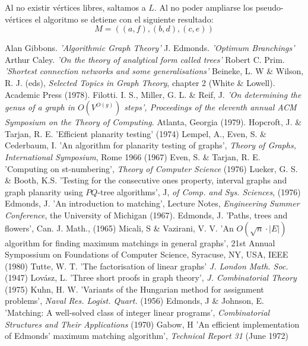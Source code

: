 \documentclass[10pt,a5paper]{book}
\begin{document}
Al no existir vértices libres, saltamos a $L$. Al no poder ampliarse los pseudo-vértices el algoritmo se detiene con el siguiente resultado:
\[ M = ((a,f),(b,d),(c,e)) \]

\begin{thebibliography}{99}
 Alan Gibbons. \emph{'Algorithmic Graph Theory'}
 J. Edmonds. \emph{'Optimum Branchings'}
 Arthur Caley. \emph{'On the theory of analytical form called trees'}
 Robert C. Prim. \emph{'Shortest connection networks and some generalisations'}
Beineke, L. W \& Wilson, R. J. (eds), \emph{Selected Topics in Graph Theory}, chapter 2 (White \& Lowell). Academic Press (1978).
Filotti. I. S., Miller, G. L. \& Reif, J. \emph{'On determining the genus of a graph in $O(V^{O(g)})$ steps', Proceedings of the eleventh annual ACM Symposium on the Theory of Computing}. Atlanta, Georgia (1979).
Hopcroft, J. \& Tarjan, R. E. 'Efficient planarity testing' (1974)
Lempel, A., Even, S. \& Cederbaum, I. 'An algorithm for planarity testing of graphs', \emph{Theory of Graphs, International Symposium}, Rome 1966 (1967)
Even, S. \& Tarjan, R. E. 'Computing on st-numbering', \emph{Theory of Computer Science} (1976)
Lueker, G. S. \& Booth, K.S. 'Testing for the consecutive ones property, interval graphs and graph planarity using $PQ$-tree algorithms', J, \emph{of Comp. and Sys. Sciences}, (1976)
 Edmonds, J. 'An introduction to matching', Lecture Notes, \emph{Engineering Summer Conference}, the University of Michigan (1967).
 Edmonds, J. 'Paths, trees and flowers', Can. J. Math., (1965)
 Micali, S \& Vazirani, V. V. 'An $O(\sqrt n \cdot |E|)$ algorithm for finding maximum matchings in general graphs', 21st Annual Sympossium on Foundations of Computer Science, Syracuse, NY, USA, IEEE (1980)
 Tutte, W. T. 'The factorisation of linear graphs' \emph{J. London Math. Soc.} (1947)
 Lovász, L. 'Three short proofs in graph theory', \emph{J. Combinatorial Theory} (1975)
 Kuhn, H. W. 'Variants of the Hungarian method for assignment problems', \emph{Naval Res. Logist. Quart.} (1956)
 Edmonds, J \& Johnson, E. 'Matching: A well-solved class of integer linear programs', \emph{Combinatorial Structures and Their Applications} (1970)
 Gabow, H 'An efficient implementation of Edmonds' maximum matching algorithm', \emph{Technical Report 31} (June 1972)
\end{thebibliography}
\end{document}
